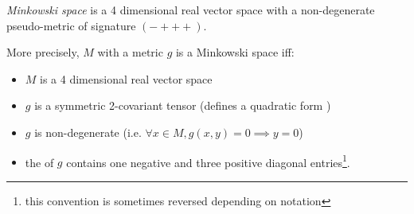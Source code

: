 \documentclass[12pt]{article}
\begin{document}
\emph{Minkowski space} is a 4 dimensional real vector space with a non-degenerate pseudo-metric of signature $(-+++)$.

More precisely, $M$ with a metric $g$ is a Minkowski space iff:

\begin{itemize}

\item $M$ is a 4 dimensional real vector space
\item $g$ is a symmetric 2-covariant tensor (defines a quadratic form )
\item $g$ is non-degenerate (i.e. $\forall {x\in M}, g(x,y) = 0 \implies y=0$)
\item the  of $g$ contains one negative and three positive diagonal entries\footnote{this convention is sometimes reversed depending on notation}.

\end{itemize}
\end{document}
